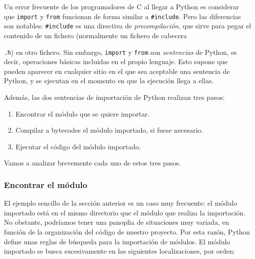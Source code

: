 Un error frecuente de los programadores de C al llegar a Python es considerar que \texttt{import} y \texttt{from} funcionan de forma similar a \texttt{\#include}. Pero las diferencias son notables: \texttt{\#include} es una directiva de \emph{precompilación}, que sirve para pegar el contenido de un fichero (normalmente un fichero de cabecera {\texttt{.h}) en otro fichero. Sin embargo, \texttt{import} y \texttt{from} son \emph{sentencias} de Python, es decir, operaciones básicas incluidas en el propio lenguaje. Esto supone que pueden aparecer en cualquier sitio en el que sea aceptable una sentencia de Python, y se ejecutan en el momento en que la ejecución llega a ellas.

Además, las dos sentencias de importación de Python realizan tres pasos:
\begin{enumerate}
	\item Encontrar el módulo que se quiere importar.
	\item Compilar a bytecodes el módulo importado, si fuese necesario.
	\item Ejecutar el código del módulo importado.
\end{enumerate}

Vamos a analizar brevemente cada uno de estos tres pasos. 

\subsubsection{Encontrar el módulo}

El ejemplo sencillo de la sección anterior es un caso muy frecuente: el módulo importado está en el mismo directorio que el módulo que realiza la importación. No obstante, podríamos tener una panoplia de situaciones muy variada, en función de la organización del código de nuestro proyecto. Por esta razón, Python define unas reglas de búsqueda para la importación de módulos. El módulo importado se busca sucesivamente en las siguientes localizaciones, por orden:

}
